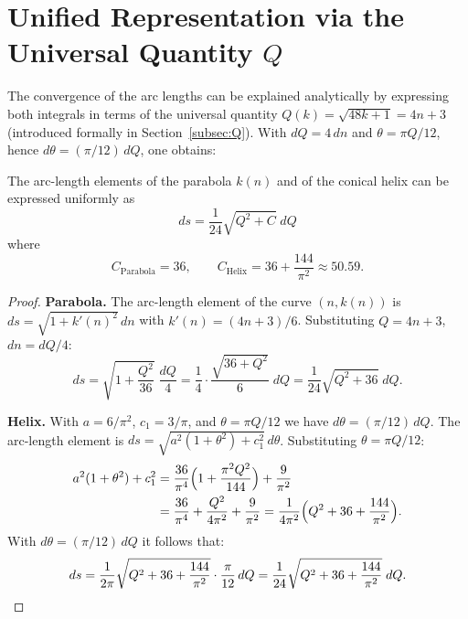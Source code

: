 \section{Unified Representation via the Universal Quantity \texorpdfstring{$Q$}{Q}}

The convergence of the arc lengths can be explained analytically by
expressing both integrals in terms of the universal quantity
$Q(k) = \sqrt{48k+1} = 4n+3$ (introduced formally in
Section~\ref{subsec:Q}). With $dQ = 4\,dn$ and
$\theta = \pi Q/12$, hence $d\theta = (\pi/12)\,dQ$, one obtains:

\begin{theorem}\label{thm:q-arc-length}
The arc-length elements of the parabola $k(n)$ and of the conical helix
can be expressed uniformly as
\begin{equation}\label{eq:ds-uniform}
  ds = \frac{1}{24}\sqrt{Q^2 + C}\; dQ
\end{equation}
where
\[
  C_{\mathrm{Parabola}} = 36,
  \qquad
  C_{\mathrm{Helix}} = 36 + \frac{144}{\pi^2} \approx 50.59.
\]
\end{theorem}

\begin{proof}
\textbf{Parabola.}\; The arc-length element of the curve $(n, k(n))$ is
$ds = \sqrt{1 + k'(n)^2}\,dn$ with $k'(n) = (4n+3)/6$.
Substituting $Q = 4n+3$, $dn = dQ/4$:
\[
  ds = \sqrt{1 + \frac{Q^2}{36}}\;\frac{dQ}{4}
     = \frac{1}{4}\cdot\frac{\sqrt{36 + Q^2}}{6}\;dQ
     = \frac{1}{24}\sqrt{Q^2 + 36}\;dQ.
\]

\textbf{Helix.}\; With $a = 6/\pi^2$, $c_1 = 3/\pi$, and
$\theta = \pi Q/12$ we have $d\theta = (\pi/12)\,dQ$. The arc-length
element is $ds = \sqrt{a^2(1+\theta^2) + c_1^2}\,d\theta$. Substituting
$\theta = \pi Q/12$:
\begin{align*}
  a^2(1+\theta^2) + c_1^2
  &= \frac{36}{\pi^4}\Bigl(1 + \frac{\pi^2 Q^2}{144}\Bigr) + \frac{9}{\pi^2}\\
  &= \frac{36}{\pi^4} + \frac{Q^2}{4\pi^2} + \frac{9}{\pi^2}
   = \frac{1}{4\pi^2}\Bigl(Q^2 + 36 + \frac{144}{\pi^2}\Bigr).
\end{align*}
With $d\theta = (\pi/12)\,dQ$ it follows that:
\[
  ds = \frac{1}{2\pi}\sqrt{Q^2 + 36 + \frac{144}{\pi^2}}
       \cdot \frac{\pi}{12}\,dQ
     = \frac{1}{24}\sqrt{Q^2 + 36 + \frac{144}{\pi^2}}\;dQ.
     \qedhere
\]
\end{proof}

